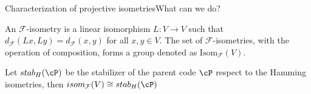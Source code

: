 \begin{frame}{Characterization of projective isometries}{What can we do?}
    
\begin{definition}
	An \(\mathcal{F}\)-isometry is a linear isomorphism \(L:V \to V\) such that \(d_{\mathcal{F}}(Lx,Ly) = d_{\mathcal{F}}(x,y)\) for all \(x,y \in V\). \pause The set of \(\mathcal{F}\)-isometries, with the operation of composition, forms a group denoted as \(\mathrm{Isom}_{\mathcal{F}}(V)\).
\end{definition}

\pause 
\begin{theorem}
Let \(stab_H(\cP)\) be the stabilizer of the parent code \(\cP\) respect to the Hamming isometries, then \(isom_{\cF}(V) \cong stab_H(\cP)\)
\end{theorem}

\end{frame}



